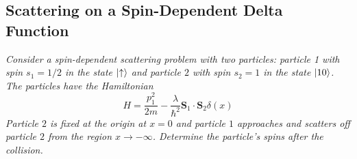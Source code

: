 \documentclass[11pt, a4paper]{article}
\renewcommand{\vec}[1]{\bm{#1}} %
\newcommand{\ua}{\uparrow}  %
\begin{document}
	
\subsection{Scattering on a Spin-Dependent Delta Function}
\textit{Consider a spin-dependent scattering problem with two particles: particle 1 with spin $ s_{1} = 1/2 $ in the state $ \ket{\ua} $ and particle $ 2 $ with spin $ s_{2} = 1 $ in the state $ \ket{10} $. The particles have the Hamiltonian}
\begin{equation*}
	H = \frac{p_{1}^{2}}{2m} - \frac{\lambda}{\hbar^{2}}\vec{S}_{1}\cdot \vec{S}_{2}\delta(x)
\end{equation*}
\textit{Particle $ 2 $ is fixed at the origin at $ x = 0 $ and particle $ 1 $ approaches and scatters off particle $ 2 $ from the region $ x \to -\infty $. Determine the particle's spins after the collision.}
\end{document}
